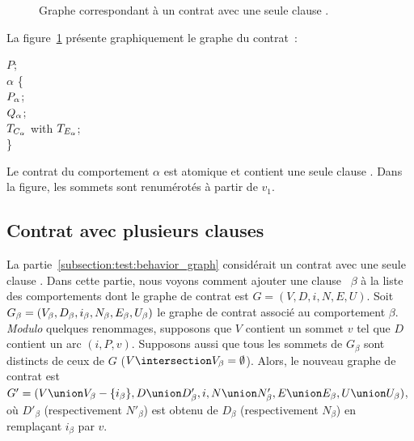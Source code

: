 \begin{figure}


\caption{\label{figure:test:behavior_graph} Graphe correspondant à un contrat
avec une seule clause \abehavior.}

\end{figure}

\begin{example}

La figure~\ref{figure:test:behavior_graph} présente graphiquement le graphe du
contrat~:
%
\begin{pre}
\arequires \(P\); \\
\abehavior \(\alpha\) \{ \\
    \arequires  \(P\sb{\alpha}\); \\
    \aensures   \(Q\sb{\alpha}\); \\
    \athrowable \(T\sb{C\sb{\alpha}}\) with \(T\sb{E\sb{\alpha}}\); \\
\}
\end{pre}
%
Le contrat du comportement $\alpha$ est atomique et contient une seule clause
\athrowable. Dans la figure, les sommets sont renumérotés à partir de $v_1$.

\end{example}

\subsection{Contrat avec plusieurs clauses \abehavior}
\label{subsection:test:behaviors_graph}

La partie~\ref{subsection:test:behavior_graph} considérait un contrat avec une
seule clause \abehavior. Dans cette partie, nous voyons comment ajouter une
clause \abehavior~$\beta$ à la liste des comportements dont le graphe de contrat
est $G = (V, D, i, N, E, U)$. Soit $G_\beta = (V_\beta, D_\beta, i_\beta,
N_\beta, \-E_\beta, U_\beta)$ le graphe de contrat associé au comportement
$\beta$. {\em Modulo} quelques renommages, supposons que $V$ contient un sommet
$v$ tel que $D$ contient un arc $(i, P, v)$. Supposons aussi que tous les
sommets de $G_\beta$ sont distincts de ceux de $G$ ($V \intersection V_\beta =
\emptyset$). Alors, le nouveau graphe de contrat est $G' = (V \union V_\beta -
\{i_\beta\}, D \union D'_\beta, i, N \union N'_\beta, E \union E_\beta, U \union
U_\beta)$, où $D'_\beta$ (respectivement $N'_\beta$) est obtenu de $D_\beta$
(respectivement $N_\beta$) en remplaçant $i_\beta$ par $v$.


